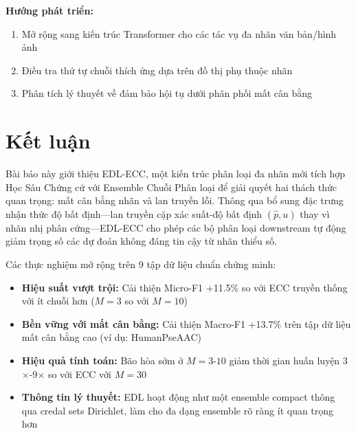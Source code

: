 \documentclass[conference]{IEEEtran}
\begin{document}
\textbf{Hướng phát triển:}
\begin{enumerate}
    \item Mở rộng sang kiến trúc Transformer cho các tác vụ đa nhãn văn bản/hình ảnh
    \item Điều tra thứ tự chuỗi thích ứng dựa trên đồ thị phụ thuộc nhãn
    \item Phân tích lý thuyết về đảm bảo hội tụ dưới phân phối mất cân bằng
\end{enumerate}

\section{Kết luận}

Bài báo này giới thiệu EDL-ECC, một kiến trúc phân loại đa nhãn mới tích hợp Học Sâu Chứng cứ với Ensemble Chuỗi Phân loại để giải quyết hai thách thức quan trọng: mất cân bằng nhãn và lan truyền lỗi. Thông qua bổ sung đặc trưng nhận thức độ bất định—lan truyền cặp xác suất-độ bất định $(\hat{p}, u)$ thay vì nhãn nhị phân cứng—EDL-ECC cho phép các bộ phân loại downstream tự động giảm trọng số các dự đoán không đáng tin cậy từ nhãn thiểu số.

Các thực nghiệm mở rộng trên 9 tập dữ liệu chuẩn chứng minh:
\begin{itemize}
    \item \textbf{Hiệu suất vượt trội:} Cải thiện Micro-F1 +11.5\% so với ECC truyền thống với ít chuỗi hơn ($M=3$ so với $M=10$)
    \item \textbf{Bền vững với mất cân bằng:} Cải thiện Macro-F1 +13.7\% trên tập dữ liệu mất cân bằng cao (ví dụ: HumanPseAAC)
    \item \textbf{Hiệu quả tính toán:} Bão hòa sớm ở $M=3$-$10$ giảm thời gian huấn luyện 3$\times$-9$\times$ so với ECC với $M=30$
    \item \textbf{Thông tin lý thuyết:} EDL hoạt động như một ensemble compact thông qua credal sets Dirichlet, làm cho đa dạng ensemble rõ ràng ít quan trọng hơn
\end{itemize}
\end{document}
